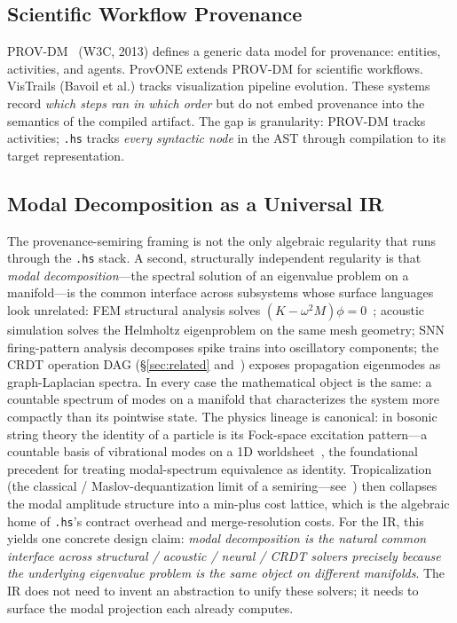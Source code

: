 \documentclass[sigconf,nonacm]{acmart}
\newcommand{\hscore}{\texttt{.hs}}
\begin{document}
\subsection{Scientific Workflow Provenance}
PROV-DM~\cite{prov-dm-w3c} (W3C, 2013) defines a generic
data model for provenance: entities, activities, and agents.
ProvONE extends PROV-DM for scientific workflows. VisTrails
(Bavoil et al.) tracks visualization pipeline evolution.
These systems record \emph{which steps ran in which order}
but do not embed provenance into the semantics of the
compiled artifact. The gap is granularity: PROV-DM tracks
activities; \hscore{} tracks \emph{every syntactic node}
in the AST through compilation to its target representation.

\subsection{Modal Decomposition as a Universal IR}
\label{sec:modal-ir}

The provenance-semiring framing is not the only algebraic regularity
that runs through the \hscore{} stack. A second, structurally
independent regularity is that \emph{modal decomposition}---the
spectral solution of an eigenvalue problem on a manifold---is the
common interface across subsystems whose surface languages look
unrelated: FEM structural analysis solves
$(K-\omega^2 M)\phi = 0$~\cite{bathe2014fem}; acoustic simulation
solves the Helmholtz eigenproblem on the same mesh geometry; SNN
firing-pattern analysis decomposes spike trains into oscillatory
components; the CRDT operation DAG (\S\ref{sec:related}
and~\cite{paper-3-crdt-ecoop2027}) exposes propagation eigenmodes
as graph-Laplacian spectra. In every case the mathematical object
is the same: a countable spectrum of modes on a manifold that
characterizes the system more compactly than its pointwise state.
The physics lineage is canonical: in bosonic string theory the
identity of a particle is its Fock-space excitation pattern---a
countable basis of vibrational modes on a 1D
worldsheet~\cite[Ch.~1--2]{polchinski1998vol1}, the foundational
precedent for treating modal-spectrum equivalence as identity.
Tropicalization (the classical / Maslov-dequantization limit of a
semiring---see~\cite{mikhalkin2005tropical,
arkani-hamed-bai-lam2017positive}) then collapses the modal
amplitude structure into a min-plus cost lattice, which is the
algebraic home of \hscore{}'s contract overhead and merge-resolution
costs. For the IR, this yields one concrete design claim:
\emph{modal decomposition is the natural common interface across
structural / acoustic / neural / CRDT solvers precisely because
the underlying eigenvalue problem is the same object on different
manifolds}. The IR does not need to invent an abstraction to unify
these solvers; it needs to surface the modal projection each
already computes.
\end{document}
